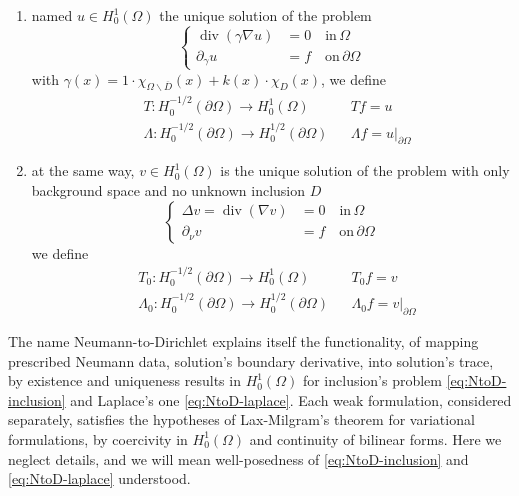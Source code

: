 \documentclass[10pt, a4paper, twoside, openright]{book}
\theoremstyle{definition}
\theoremstyle{plain}
\theoremstyle{plain}
\theoremstyle{plain}
\theoremstyle{plain}
\theoremstyle{plain}
\theoremstyle{plain}
\theoremstyle{plain}
\theoremstyle{plain}
\DeclareMathOperator{\divergence}{div}
\begin{document}
\begin{enumerate}
 \item named $u\in H^1_0(\Omega)$ the unique solution of the problem
 \begin{equation}
 \label{eq:NtoD-inclusion}
  \left\{
  \begin{aligned}
  \divergence(\gamma\nabla u) &= 0 \quad\text{in}\,\Omega \\
            \partial_\gamma u &= f \quad\text{on}\,\partial \Omega
  \end{aligned}
  \right.
 \end{equation}
 with $\gamma(x) = 1 \cdot \chi_{\Omega\backslash\overline{D}}(x) + k(x)\cdot\chi_D(x)$, we define
 \begin{align}
 &T: H^{-1/2}_0(\partial \Omega) \to H^1_0(\Omega) && Tf = u \\
 &\Lambda: H^{-1/2}_0(\partial \Omega) \to H^{1/2}_0(\partial\Omega) && \Lambda f = u|_{\partial\Omega}
 \end{align}
 \item at the same way, $v\in H^1_0(\Omega)$ is the unique solution of the problem with only background space and no unknown inclusion $D$
 \begin{equation}
 \label{eq:NtoD-laplace}
  \left\{
  \begin{aligned}
  \Delta v = \divergence(\nabla v) &= 0 \quad\text{in}\,\Omega \\
            \partial_\nu v &= f \quad\text{on}\,\partial \Omega
  \end{aligned}
  \right.
 \end{equation}
 we define
 \begin{align}
 &T_0: H^{-1/2}_0(\partial \Omega) \to H^1_0(\Omega) && T_0f = v \\
 &\Lambda_0: H^{-1/2}_0(\partial \Omega) \to H^{1/2}_0(\partial\Omega) && \Lambda_0 f = v|_{\partial\Omega}
 \end{align}
\end{enumerate}
The name Neumann-to-Dirichlet explains itself the functionality, of mapping prescribed Neumann data, solution's boundary derivative, into solution's trace, by existence and uniqueness results in $H^1_0(\Omega)$ for inclusion's problem \ref{eq:NtoD-inclusion} and Laplace's one \ref{eq:NtoD-laplace}.
Each weak formulation, considered separately, satisfies the hypotheses of Lax-Milgram's theorem for variational formulations, by coercivity in $H^1_0(\Omega)$ and continuity of bilinear forms. Here we neglect details, and we will mean well-posedness of \ref{eq:NtoD-inclusion} and \ref{eq:NtoD-laplace} understood.
\end{document}
